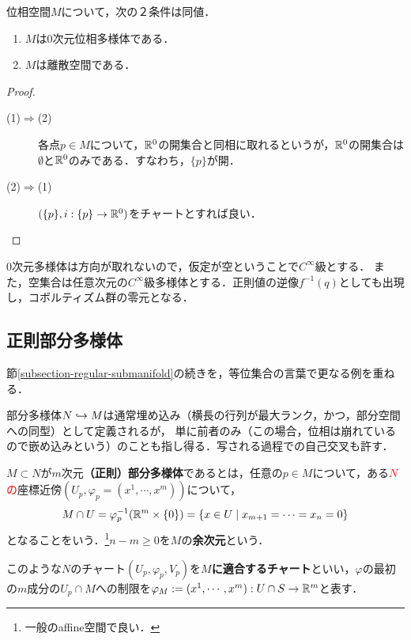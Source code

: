 \documentclass[uplatex,dvipdfmx]{jsreport}
\begin{document}
\begin{lemma}[0次元多様体の特徴づけ]
    位相空間$M$について，次の２条件は同値．
    \begin{enumerate}
        \item $M$は$0$次元位相多様体である．
        \item $M$は離散空間である．
    \end{enumerate}
\end{lemma}
\begin{proof}\mbox{}
    \begin{description}
        \item[(1)$\Rightarrow$(2)] 各点$p\in M$について，$\mathbb{R}^0$の開集合と同相に取れるというが，$\mathbb{R}^0$の開集合は$\emptyset$と$\mathbb{R}^0$のみである．すなわち，$\{p\}$が開．
        \item[(2)$\Rightarrow$(1)] $(\{p\},i:\{p\}\to\mathbb{R}^0)$をチャートとすれば良い．
    \end{description}
\end{proof}
\begin{remark}
    $0$次元多様体は方向が取れないので，仮定が空ということで$C^\infty$級とする．
    また，空集合は任意次元の$C^\infty$級多様体とする．正則値の逆像$f^{-1}(q)$としても出現し，コボルティズム群の零元となる．
\end{remark}

\subsection{正則部分多様体}

\begin{tcolorbox}[colframe=ForestGreen, colback=ForestGreen!10!white,breakable,colbacktitle=ForestGreen!40!white,coltitle=black,fonttitle=\bfseries\sffamily,
title=]
    節\ref{subsection-regular-submanifold}の続きを，等位集合の言葉で更なる例を重ねる．
    
    部分多様体$N\hookrightarrow M$は通常埋め込み（横長の行列が最大ランク，かつ，部分空間への同型）として定義されるが，
    単に前者のみ（この場合，位相は崩れているので嵌め込みという）のことも指し得る．写される過程での自己交叉も許す．
\end{tcolorbox}

\begin{definition}\label{def-regular-submanifold}
    $M\subset N$が$m$次元\textbf{（正則）部分多様体}であるとは，任意の$p\in M$について，ある\textcolor{red}{$N$の}座標近傍$(U_p,\varphi_p=(x^1,\cdots,x^m))$について，
    \[M\cap U=\varphi_p^{-1}(\mathbb{R}^m\times\{0\})=\{x\in U\mid x_{m+1}=\cdots=x_n=0\}\]
    となることをいう．\footnote{一般のaffine空間で良い．}$n-m\ge 0$を$M$の\textbf{余次元}という．
\end{definition}
\begin{notation}
    このような$N$のチャート$(U_p,\varphi_p,V_p)$を\textbf{$M$に適合するチャート}といい，$\varphi$の最初の$m$成分の$U_p\cap M$への制限を$\varphi_M:=(x^1,\cdots,x^m):U\cap S\to\mathbb{R}^m$と表す．
\end{notation}
\end{document}
